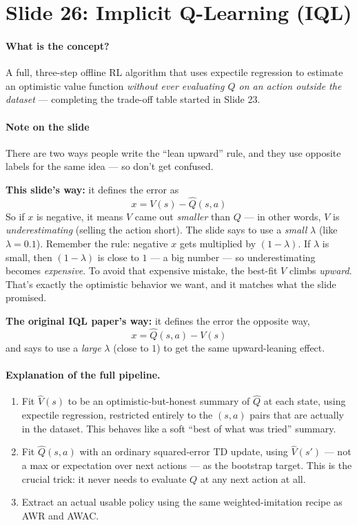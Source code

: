 \documentclass[11pt]{article}
\begin{document}
\section{Slide 26: Implicit Q-Learning (IQL)}

\paragraph{What is the concept?}
A full, three-step offline RL algorithm that uses expectile regression to estimate an
optimistic value function \emph{without ever evaluating $Q$ on an action outside the
dataset} --- completing the trade-off table started in Slide 23.

\paragraph{Note on the slide}
There are two ways people write the ``lean upward'' rule, and they use opposite
labels for the same idea --- so don't get confused.

\textbf{This slide's way:} it defines the error as
\[
x = V(s) - \hat{Q}(s,a)
\]
So if $x$ is negative, it means $V$ came out \emph{smaller} than $Q$ --- in other
words, $V$ is \emph{underestimating} (selling the action short). The slide says to
use a \emph{small} $\lambda$ (like $\lambda = 0.1$). Remember the rule: negative $x$
gets multiplied by $(1-\lambda)$. If $\lambda$ is small, then $(1-\lambda)$ is close
to $1$ --- a big number --- so underestimating becomes \emph{expensive}. To avoid
that expensive mistake, the best-fit $V$ climbs \emph{upward}. That's exactly the
optimistic behavior we want, and it matches what the slide promised.

\textbf{The original IQL paper's way:} it defines the error the opposite way,
\[
x = \hat{Q}(s,a) - V(s)
\]
and says to use a \emph{large} $\lambda$ (close to $1$) to get the same upward-leaning
effect.

\paragraph{Explanation of the full pipeline.}
\begin{enumerate}
\item Fit $\hat V(s)$ to be an optimistic-but-honest summary of $\hat Q$ at each state,
using expectile regression, restricted entirely to the $(s,a)$ pairs that are actually in
the dataset. This behaves like a soft ``best of what was tried'' summary.
\item Fit $\hat Q(s,a)$ with an ordinary squared-error TD update, using $\hat V(s')$ ---
not a max or expectation over next actions --- as the bootstrap target. This is the
crucial trick: it never needs to evaluate $Q$ at any next action at all.
\item Extract an actual usable policy using the same weighted-imitation recipe as AWR
and AWAC.
\end{enumerate}
\end{document}
